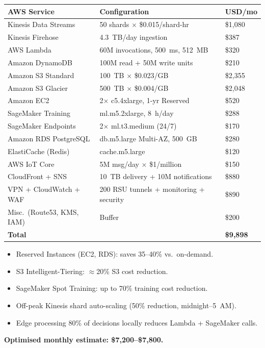 \documentclass[11pt,a4paper]{article}
\begin{document}
\vspace{4pt}
\renewcommand{\arraystretch}{1.2}
\begin{center}
\begin{tabular}{|L{4.2cm}|L{5.2cm}|L{2.2cm}|}
\hline
\textbf{AWS Service} & \textbf{Configuration} & \textbf{USD/mo} \\
\hline
Kinesis Data Streams & 50 shards $\times$ \$0.015/shard-hr & \$1,080 \\
\hline
Kinesis Firehose & 4.3~TB/day ingestion & \$387 \\
\hline
AWS Lambda & 60M invocations, 500~ms, 512~MB & \$320 \\
\hline
Amazon DynamoDB & 100M read + 50M write units & \$210 \\
\hline
Amazon S3 Standard & 100~TB $\times$ \$0.023/GB & \$2,355 \\
\hline
Amazon S3 Glacier & 500~TB $\times$ \$0.004/GB & \$2,048 \\
\hline
Amazon EC2 & 2$\times$ c5.4xlarge, 1-yr Reserved & \$520 \\
\hline
SageMaker Training & ml.m5.2xlarge, 8~h/day & \$288 \\
\hline
SageMaker Endpoints & 2$\times$ ml.t3.medium (24/7) & \$170 \\
\hline
Amazon RDS PostgreSQL & db.m5.large Multi-AZ, 500~GB & \$280 \\
\hline
ElastiCache (Redis) & cache.m5.large & \$120 \\
\hline
AWS IoT Core & 5M msg/day $\times$ \$1/million & \$150 \\
\hline
CloudFront + SNS & 10~TB delivery + 10M notifications & \$880 \\
\hline
VPN + CloudWatch + WAF & 200 RSU tunnels + monitoring + security & \$890 \\
\hline
Misc.\ (Route53, KMS, IAM) & Buffer & \$200 \\
\hline
\textbf{Total} & & \textbf{\$9,898} \\
\hline
\end{tabular}
\end{center}

\begin{keybox}
\begin{itemize}
  \item Reserved Instances (EC2, RDS): saves 35--40\% vs.\ on-demand.
  \item S3 Intelligent-Tiering: $\approx$20\% S3 cost reduction.
  \item SageMaker Spot Training: up to 70\% training cost reduction.
  \item Off-peak Kinesis shard auto-scaling (50\% reduction, midnight--5~AM).
  \item Edge processing 80\% of decisions locally reduces Lambda + SageMaker calls.
\end{itemize}
\textbf{Optimised monthly estimate: \$7,200--\$7,800.}
\end{keybox}
\end{document}
